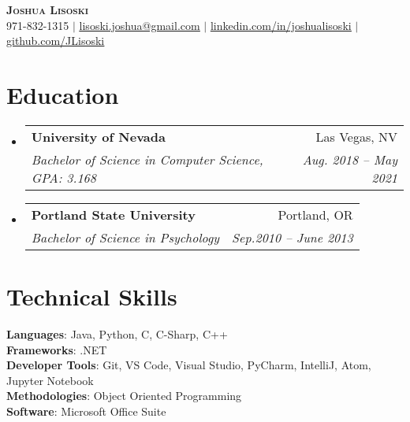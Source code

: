 \documentclass[letterpaper,11pt]{article}
\makeatletter
\newcommand{\resumeSubheading}[4]{
  \vspace{-2pt}\item
    \begin{tabular*}{0.97\textwidth}[t]{l@{\extracolsep{\fill}}r}
      \textbf{#1} & #2 \\
      \textit{\small#3} & \textit{\small #4} \\
    \end{tabular*}\vspace{-7pt}
}
\newcommand{\resumeSubHeadingListStart}{\begin{itemize}[leftmargin=0.15in, label={}]}
\newcommand{\resumeSubHeadingListEnd}{\end{itemize}}
\makeatother
\begin{document}

\begin{center}
    \textbf{\Huge \scshape Joshua Lisoski} \\ \vspace{1pt}
    \small 971-832-1315 $|$ \href{mailto:x@x.com}{\underline{lisoski.joshua@gmail.com}} $|$ 
    \href{https://linkedin.com/in/...}{\underline{linkedin.com/in/joshualisoski}} $|$
    \href{https://github.com/...}{\underline{github.com/JLisoski}}
\end{center}


\section{Education}
  \resumeSubHeadingListStart
    \resumeSubheading
      {University of Nevada}{Las Vegas, NV}
      {Bachelor of Science in Computer Science, GPA: 3.168}{Aug. 2018 -- May 2021}
    \resumeSubheading
      {Portland State University}{Portland, OR}
      {Bachelor of Science in Psychology}{Sep.2010 -- June 2013}
  \resumeSubHeadingListEnd

\section{Technical Skills}
 \begin{itemize}[leftmargin=0.15in, label={}]
    \small{\item{
     \textbf{Languages}{: Java, Python, C, C-Sharp, C++} \\
     \textbf{Frameworks}{: .NET} \\
     \textbf{Developer Tools}{: Git, VS Code, Visual Studio, PyCharm, IntelliJ, Atom, Jupyter Notebook} \\
     \textbf{Methodologies}{: Object Oriented Programming} \\
     \textbf{Software}{: Microsoft Office Suite}
    }}
 \end{itemize}
 
\end{document}
